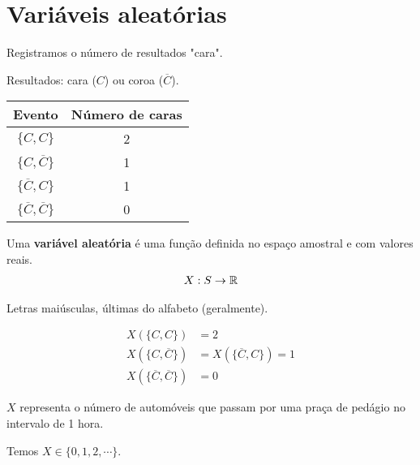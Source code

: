 \section{Variáveis aleatórias}

\begin{example}\label{exp:ch02-va-moeda}
    Registramos o número de resultados "cara".

    Resultados: cara ($C$) ou coroa ($\overline{C}$).

    \begin{center}
        \begin{tabular}{cc}
            \toprule
            Evento                          & Número de caras \\
            \midrule
            $\{C,C\}$                       & 2 \\
            $\{C,\overline{C}\}$            & 1 \\
            $\{\overline{C},C\}$            & 1 \\
            $\{\overline{C},\overline{C}\}$ & 0 \\
            \bottomrule
        \end{tabular}
    \end{center}
\end{example}

\begin{definition}
    Uma \textbf{variável aleatória} é uma função
    definida no espaço amostral e com valores reais.
    \begin{align*}
        X: S \to \operatorname{\mathbb{R}}
    \end{align*}
    \begin{notation}
        Letras maiúsculas, últimas do alfabeto (geralmente).
    \end{notation}
\end{definition}

\begin{example}
    \begin{align*}
        X(\{C,C\})                       &= 2 \\
        X(\{C,\overline{C}\})            &=
        X(\{\overline{C},C\})            = 1 \\
        X(\{\overline{C},\overline{C}\}) &= 0
    \end{align*}
\end{example}

\begin{example}\label{exp:ch02-va-pedagio}
    $X$ representa o número de automóveis que passam
    por uma praça de pedágio no intervalo de 1 hora.

    Temos $X \in \{0, 1, 2, \cdots\}$.
\end{example}

